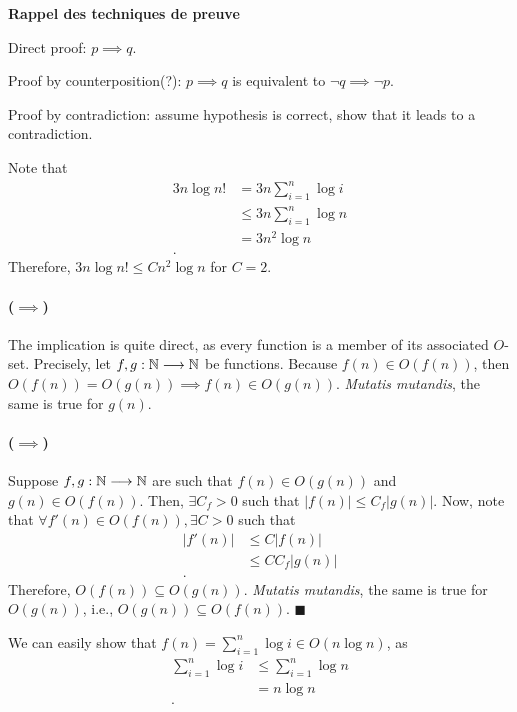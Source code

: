  

\textbf{Rappel des techniques de preuve}

Direct proof: $p\implies q$.

Proof by counterposition(?): $p\implies q$ is equivalent to $\neg q \implies \neg p$.

Proof by contradiction: assume hypothesis is correct, show that it leads to a contradiction.


Note that
\begin{align*}
    3n \log n! &= 3n \sum_{i=1}^{n} \log i \\
    &\le  3n \sum_{i=1}^{n} \log n \\
    &= 3n^2 \log n \\
.\end{align*}
Therefore, $3n \log n! \le C n^2 \log n$ for $C=2$.


\paragraph{($\implies$)}
The implication is quite direct, as every function is a member of its associated $O$-set.
Precisely, let $f,g: \mathbb{N} \longrightarrow \mathbb{N}$ be functions.
Because $f(n) \in O(f(n))$, then $O(f(n)) = O(g(n)) \implies f(n) \in O(g(n))$. \emph{Mutatis mutandis}, the same is true for $g(n)$.

\paragraph{($\implies$)}
Suppose $f,g: \mathbb{N} \longrightarrow \mathbb{N}$ are such that $f(n) \in O(g(n))$ and $g(n) \in O(f(n))$.
Then, $\exists C_f > 0$ such that $|f(n)| \le C_f |g(n)|$.
Now, note that $\forall f'(n) \in O(f(n)), \exists C > 0$ such that
\begin{align*}
    |f'(n)| &\le C |f(n)| \\
    &\le C C_f |g(n)|  \\
.\end{align*}
Therefore, $O(f(n)) \subseteq O(g(n))$.
\emph{Mutatis mutandis}, the same is true for $O(g(n))$, i.e., $O(g(n)) \subseteq O(f(n))$. $\blacksquare$


We can easily show that $f(n) = \sum_{i=1}^{n} \log i \in O(n \log n)$, as
\begin{align*}
    \sum_{i=1}^{n} \log i &\le \sum_{i=1}^{n} \log n \\
    &= n \log n \\
.\end{align*}


